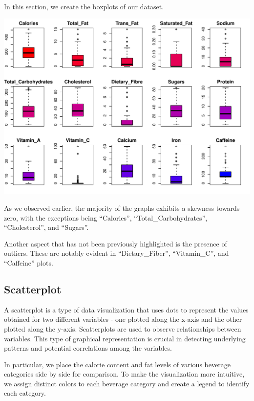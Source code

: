\documentclass[
]{article}
\begin{document}
In this section, we create the boxplots of our dataset.

\begin{center}\includegraphics{Statistical_Learning_Final_Report_files/figure-latex/boxplot-1} \end{center}

As we observed earlier, the majority of the graphs exhibits a skewness
towards zero, with the exceptions being ``Calories'',
``Total\_Carbohydrates'', ``Cholesterol'', and ``Sugars''.

Another aspect that has not been previously highlighted is the presence
of outliers. These are notably evident in ``Dietary\_Fiber'',
``Vitamin\_C'', and ``Caffeine'' plots.

\hypertarget{scatterplot}{%
\subsection{Scatterplot}\label{scatterplot}}

A scatterplot is a type of data visualization that uses dots to
represent the values obtained for two different variables - one plotted
along the x-axis and the other plotted along the y-axis. Scatterplots
are used to observe relationships between variables. This type of
graphical representation is crucial in detecting underlying patterns and
potential correlations among the variables.

In particular, we place the calorie content and fat levels of various
beverage categories side by side for comparison. To make the
visualization more intuitive, we assign distinct colors to each beverage
category and create a legend to identify each category.
\end{document}
